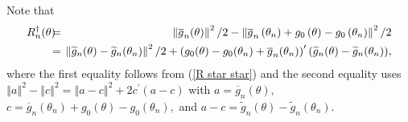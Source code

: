 \documentclass[12pt,thmsb,titlepage,final,oneside,letterpaper]{article}
\begin{document}
Note that%
\begin{eqnarray}
R_{n}^{\dag }(\theta )\hspace{-0.08in} &=&\hspace{-0.08in}\left\Vert 
\overline{g}_{n}(\theta )\right\Vert ^{2}/2-\left\Vert \overline{g}%
_{n}\left( \theta _{n}\right) +g_{0}\left( \theta \right) -g_{0}\left(
\theta _{n}\right) \right\Vert ^{2}/2  \notag \\
&=&\hspace{-0.08in}\left\Vert \widetilde{g}_{n}(\theta )-\widetilde{g}%
_{n}(\theta _{n})\right\Vert ^{2}/2+\left( g_{0}(\theta )-g_{0}(\theta _{n})+%
\overline{g}_{n}(\theta _{n})\right) ^{\prime }(\widetilde{g}_{n}(\theta )-%
\widetilde{g}_{n}(\theta _{n})),  \label{r star 1}
\end{eqnarray}%
where the first equality follows from (\ref{R star star}) and the second
equality uses $\left\Vert a\right\Vert ^{2}-\left\Vert c\right\Vert
^{2}=\left\Vert a-c\right\Vert ^{2}+2c^{\prime }(a-c)$ with $a=\overline{g}%
_{n}\left( \theta \right) ,$ $c=\overline{g}_{n}(\theta _{n})+g_{0}(\theta
)-g_{0}(\theta _{n}),$ and $a-c=\widetilde{g}_{n}(\theta )-\widetilde{g}%
_{n}(\theta _{n}).$
\end{document}
